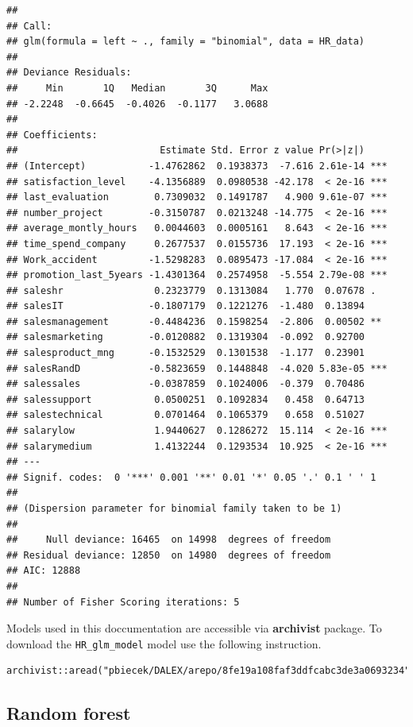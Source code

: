 \documentclass[]{book}
\theoremstyle{definition}
\theoremstyle{definition}
\theoremstyle{definition}
\theoremstyle{remark}
\begin{document}
\begin{verbatim}
## 
## Call:
## glm(formula = left ~ ., family = "binomial", data = HR_data)
## 
## Deviance Residuals: 
##     Min       1Q   Median       3Q      Max  
## -2.2248  -0.6645  -0.4026  -0.1177   3.0688  
## 
## Coefficients:
##                         Estimate Std. Error z value Pr(>|z|)    
## (Intercept)           -1.4762862  0.1938373  -7.616 2.61e-14 ***
## satisfaction_level    -4.1356889  0.0980538 -42.178  < 2e-16 ***
## last_evaluation        0.7309032  0.1491787   4.900 9.61e-07 ***
## number_project        -0.3150787  0.0213248 -14.775  < 2e-16 ***
## average_montly_hours   0.0044603  0.0005161   8.643  < 2e-16 ***
## time_spend_company     0.2677537  0.0155736  17.193  < 2e-16 ***
## Work_accident         -1.5298283  0.0895473 -17.084  < 2e-16 ***
## promotion_last_5years -1.4301364  0.2574958  -5.554 2.79e-08 ***
## saleshr                0.2323779  0.1313084   1.770  0.07678 .  
## salesIT               -0.1807179  0.1221276  -1.480  0.13894    
## salesmanagement       -0.4484236  0.1598254  -2.806  0.00502 ** 
## salesmarketing        -0.0120882  0.1319304  -0.092  0.92700    
## salesproduct_mng      -0.1532529  0.1301538  -1.177  0.23901    
## salesRandD            -0.5823659  0.1448848  -4.020 5.83e-05 ***
## salessales            -0.0387859  0.1024006  -0.379  0.70486    
## salessupport           0.0500251  0.1092834   0.458  0.64713    
## salestechnical         0.0701464  0.1065379   0.658  0.51027    
## salarylow              1.9440627  0.1286272  15.114  < 2e-16 ***
## salarymedium           1.4132244  0.1293534  10.925  < 2e-16 ***
## ---
## Signif. codes:  0 '***' 0.001 '**' 0.01 '*' 0.05 '.' 0.1 ' ' 1
## 
## (Dispersion parameter for binomial family taken to be 1)
## 
##     Null deviance: 16465  on 14998  degrees of freedom
## Residual deviance: 12850  on 14980  degrees of freedom
## AIC: 12888
## 
## Number of Fisher Scoring iterations: 5
\end{verbatim}

Models used in this doccumentation are accessible via \textbf{archivist}
package. To download the \texttt{HR\_glm\_model} model use the following
instruction.

\begin{verbatim}
archivist::aread("pbiecek/DALEX/arepo/8fe19a108faf3ddfcabc3de3a0693234")
\end{verbatim}

\subsection{Random forest}\label{random-forest}
\end{document}
